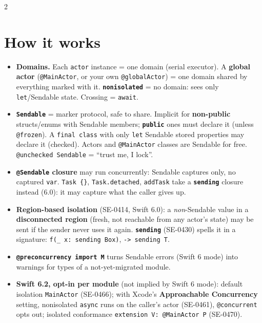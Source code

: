 \documentclass[8pt]{extarticle}
\begin{document}



\begin{multicols}{2}
\raggedright

\section{How it works}
\begin{itemize}
  \item \textbf{Domains.} Each \texttt{actor} instance = one domain (serial
        executor). A \textbf{global actor} (\texttt{@MainActor}, or
        your own \texttt{@globalActor}) = one
        domain shared by everything marked with it. \textbf{\texttt{nonisolated}}
        = no domain: sees only \texttt{let}/Sendable state. Crossing = \texttt{await}.
  \item \textbf{\texttt{Sendable}} = marker protocol, safe to share. Implicit for
        \textbf{non-public} structs/enums with Sendable members;
        \textbf{\texttt{public}} ones must declare it (unless \texttt{@frozen}). A \texttt{final class}
        with only \texttt{let} Sendable stored properties may declare it (checked).
        Actors and \texttt{@MainActor} classes are Sendable for free.
        \texttt{@unchecked Sendable} = ``trust me, I lock''.
  \item \textbf{\texttt{@Sendable} closure} may run concurrently: Sendable
        captures only, no captured \texttt{var}. \texttt{Task \{\}},
        \texttt{Task.detached}, \texttt{addTask} take a \textbf{\texttt{sending}} closure instead (6.0): it may capture what the caller gives up.
  \item \textbf{Region-based isolation} (SE-0414, Swift 6.0): a
        \emph{non}-Sendable value in a \textbf{disconnected region} (fresh, not
        reachable from any actor's state) may be sent if the sender never uses it
        again. \textbf{\texttt{sending}} (SE-0430) spells it in a signature:
        \texttt{f(\_ x: sending Box)}, \texttt{-> sending T}.
  \item \textbf{\texttt{@preconcurrency import M}} turns Sendable errors (Swift 6 mode) into warnings for
        types of a not-yet-migrated module.
  \item \textbf{Swift 6.2, opt-in per module} (not implied by Swift 6 mode):
        default isolation \texttt{MainActor} (SE-0466); with Xcode's \textbf{Approachable Concurrency} setting, nonisolated
        \texttt{async} runs on the caller's actor (SE-0461), \texttt{@concurrent}
        opts out; isolated conformance \texttt{extension V: @MainActor P} (SE-0470).
\end{itemize}


\end{multicols}
\end{document}
